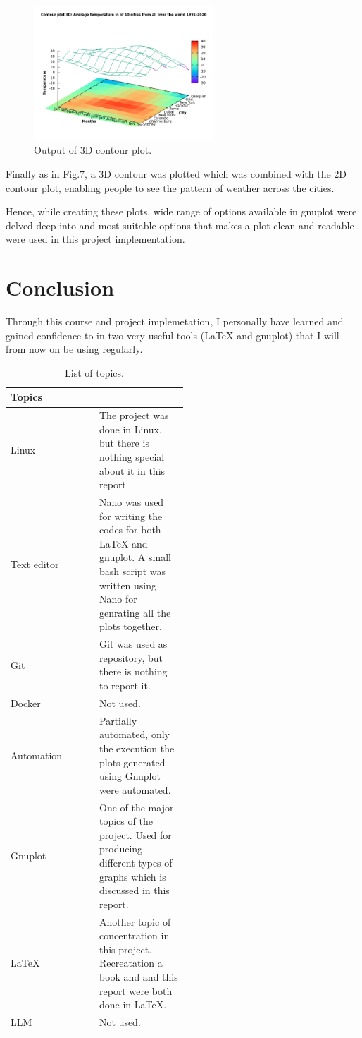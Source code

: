 \documentclass[runningheads]{llncs}
\begin{document}
\begin{figure}[H]
    \centering
    \includegraphics[width=0.6\textwidth]{Contour3D.jpg}
    \caption{Output of 3D contour plot.}
\end{figure}

Finally as in Fig.7, a 3D contour was plotted which was combined with the 2D contour plot, enabling people to see the pattern of weather across the cities.

Hence, while creating these plots, wide range of options available in gnuplot were delved deep into and most suitable options that makes a plot clean and readable were used in this project implementation.


\section{Conclusion}
Through this course and project implemetation, I personally have learned and gained confidence to in two very useful tools ({\LaTeX} and gnuplot) that I will from now on be using regularly. 


\begin{table}
\centering
\begin{tabular}{l p{0.5\linewidth}}
Topics\\
\hline
Linux &  The project was done in Linux, but there is nothing special about it in this report\\
Text editor &  Nano was used for writing the codes for both {\LaTeX} and gnuplot. A small bash script was written using Nano for genrating all the plots together. \\
Git & Git was used as repository, but there is nothing to report it.\\
Docker & Not used. \\
Automation & Partially automated, only the execution the plots generated using Gnuplot were automated. \\
Gnuplot & One of the major topics of the project. Used for producing different types of graphs which is discussed in this report. \\
\LaTeX & Another topic of concentration in this project. Recreatation a book and and this report were both done in \LaTeX. \\
LLM & Not used.
\end{tabular}
\caption{List of topics.}
\end{table}
\end{document}
